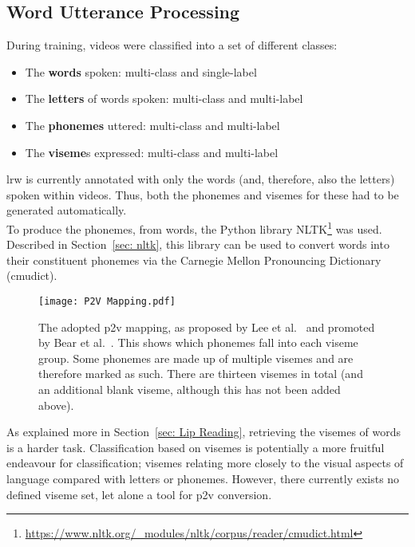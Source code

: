 \subsection{Word Utterance Processing}
\label{sec: Word Utterance Processing}
During training, videos were classified into a set of different classes:
\begin{itemize}
    \item The \textbf{words} spoken: \gls{multi-class} and \gls{single-label}
    \item The \textbf{letters} of words spoken: \gls{multi-class} and \gls{multi-label}
    \item The \textbf{\gls{phoneme}s} uttered: \gls{multi-class} and \gls{multi-label}
    \item The \textbf{\gls{viseme}}s expressed: \gls{multi-class} and \gls{multi-label}
\end{itemize}
\Gls{lrw} is currently annotated with only the words (and, therefore, also the letters) spoken within videos. Thus, both the \gls{phoneme}s and \gls{viseme}s for these had to be generated automatically.\\
To produce the \gls{phoneme}s, from words, the Python library NLTK\footnote{\url{https://www.nltk.org/_modules/nltk/corpus/reader/cmudict.html}} was used. Described in Section~\ref{sec: nltk}, this library can be used to convert words into their constituent \gls{phoneme}s via the Carnegie Mellon Pronouncing Dictionary (cmudict).\\
\begin{figure}
\centering
\texttt{[image: P2V Mapping.pdf]}
\caption[The adopted \acrshort{p2v} mapping, as proposed by Lee et al. and promoted by Bear et al.]{The adopted \acrshort{p2v} mapping, as proposed by Lee et al.~\cite{best_phoneme_viseme_mapping} and promoted by Bear et al.~\cite{phoneme_viseme_mapping_review}. This shows which \gls{phoneme}s fall into each \gls{viseme} group. Some \gls{phoneme}s are made up of multiple \gls{viseme}s and are therefore marked as such. There are thirteen \gls{viseme}s in total (and an additional blank \gls{viseme}, although this has not been added above).}
\label{fig:P2V Mapping}
\end{figure}
As explained more in Section~\ref{sec: Lip Reading}, retrieving the \gls{viseme}s of words is a harder task. Classification based on \gls{viseme}s is potentially a more fruitful endeavour for classification; \gls{viseme}s relating more closely to the visual aspects of language compared with letters or \gls{phoneme}s. However, there currently exists no defined \gls{viseme} set, let alone a tool for \acrfull{p2v} conversion.\\
